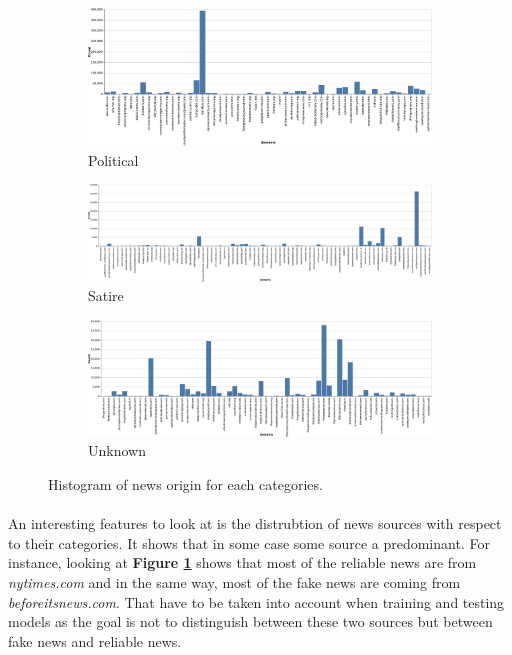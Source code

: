 \begin{figure}\ContinuedFloat
    \begin{subfigure}[b]{1\textwidth}
         \centering
         \includegraphics[width=\textwidth]{chapter/images/data_exploration/political.eps}
         \caption{Political}
     \end{subfigure}
     \vfill
     \begin{subfigure}[b]{1\textwidth}
         \centering
         \includegraphics[width=\textwidth]{chapter/images/data_exploration/satire.eps}
         \caption{Satire}
     \end{subfigure}
     \vfill
     \begin{subfigure}[b]{1\textwidth}
         \centering
         \includegraphics[width=\textwidth]{chapter/images/data_exploration/unknown.eps}
         \caption{Unknown}
     \end{subfigure}
        \caption{Histogram of news origin for each categories.}
        \label{fig:data_explo:source}
\end{figure}

\paragraph{} An interesting features to look at is the distrubtion of news sources with respect to their categories. It shows that in some case some source a predominant. For instance, looking at \textbf{Figure \ref{fig:data_explo:source}} shows that most of the reliable news are from \textit{nytimes.com} and in the same way, most of the fake news are coming from \textit{beforeitsnews.com}. That have to be taken into account when training and testing models as the goal is not to distinguish between these two sources but between fake news and reliable news. 

